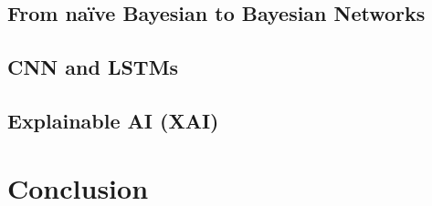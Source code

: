 \documentclass[runningheads]{llncs}
\begin{document}
		\subsection{From naïve Bayesian to Bayesian Networks}
		
		\subsection{CNN and LSTMs}
		
		\subsection{Explainable AI (XAI)}
		
		
		
		
		
		\section{Conclusion}
\end{document}
